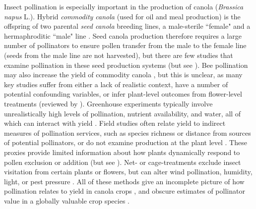 \documentclass[12pt]{article} %
\begin{document}

Insect pollination is especially important in the production of canola (\textit{Brassica napus} L.).
Hybrid \emph{commodity canola} (used for oil and meal production) is the offspring of two parental \emph{seed canola} breeding lines, a male-sterile ``female" and a hermaphroditic ``male" line \citep{westcott2001,steffan2003,clay2009}. 
Seed canola production therefore requires a large number of pollinators to ensure pollen transfer from the male to the female line (seeds from the male line are not harvested), but there are few studies that examine pollination in these seed production systems (but see \citealp{mesquida1981, mesquida1991}).
Bee pollination may also increase the yield of commodity canola \citep{morandin2005, rader_phd, bommarco2012, bartomeus2015,perrot2018}, but this is unclear, as many key studies suffer from either a lack of realistic context, have a number of potential confounding variables, or infer plant-level outcomes from flower-level treatments (reviewed by \citealt{ouvrard2019}). 
Greenhouse experiments typically involve unrealistically high levels of pollination, nutrient availability, and water, all of which can interact with yield \citep{bartomeus2015,marini2015}.
Field studies often relate yield to indirect measures of pollination services, such as species richness or distance from sources of potential pollinators, or do not examine production at the plant level \citep{morandin2005, Ricketts2008}.
These proxies provide limited information about how plants dynamically respond to pollen exclusion or addition (but see \citealp{sabbahi2005}).
Net- or cage-treatments exclude insect visitation from certain plants or flowers, but can alter wind pollination, humidity, light, or pest pressure \citep{olsson1960, neal2004, jauker2008}.
All of these methods give an incomplete picture of how pollination relates to yield in canola crops \citep{ouvrard2019}, and obscure estimates of pollinator value in a globally valuable crop species \citep{melathopoulos2015}.
\end{document}
